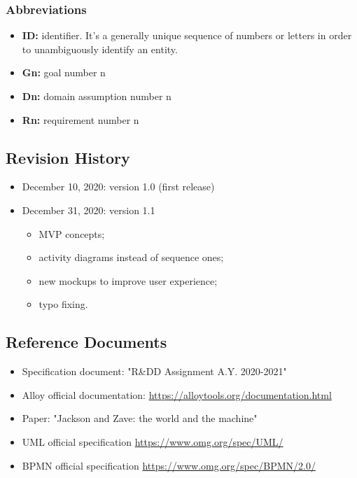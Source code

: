 \documentclass[table, 12pt]{article}
\begin{document}
\subsubsection{Abbreviations}
\begin{itemize}
    \item {\textbf{ID:} identifier. It's a generally unique sequence of numbers or letters in order to unambiguously identify an entity.}
    \item {\textbf{Gn:} goal number n}
    \item \textbf{Dn:} domain assumption number n
    \item \textbf{Rn:} requirement number n
\end{itemize}
\subsection{Revision History}
\begin{itemize}
    \item December 10, 2020: version 1.0 (first release)
    \item December 31, 2020: version 1.1 \begin{itemize}
              \item MVP concepts;
              \item activity diagrams instead of sequence ones;
              \item new mockups to improve user experience;
              \item typo fixing.
          \end{itemize}
\end{itemize}
\subsection{Reference Documents}
\begin{itemize}
    \item {Specification document: "R\&DD Assignment A.Y. 2020-2021"}
    \item {Alloy official documentation: \href{https://alloytools.org/documentation.html}{https://alloytools.org/documentation.html}}
    \item {Paper: "Jackson and Zave: the world and the machine"}
    \item {UML official specification \href{https://www.omg.org/spec/UML/}{https://www.omg.org/spec/UML/}}
    \item {BPMN official specification \href{https://www.omg.org/spec/BPMN/2.0/}{https://www.omg.org/spec/BPMN/2.0/}}
\end{itemize}
\end{document}
